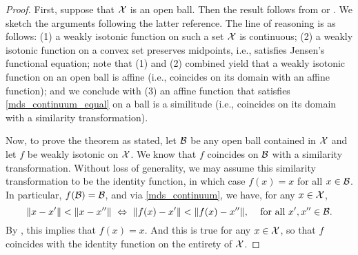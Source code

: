 \documentclass[twoside, 11pt]{article}
\begin{document}
\begin{proof}
First, suppose that $\mathcal{X}$ is an open ball. Then the result follows from \cite[Prop~7]{klein} or \cite[Th~1]{arias2017some}.
We sketch the arguments following the latter reference. The line of reasoning is as follows: (1) a weakly isotonic function on such a set $\mathcal{X}$ is continuous; (2) a weakly isotonic function on a convex set preserves midpoints, i.e., satisfies Jensen's functional equation; 
note that (1) and (2) combined yield that a weakly isotonic function on an open ball is affine (i.e., coincides on its domain with an affine function); and we conclude with (3) an affine function that satisfies \eqref{mds_continuum_equal} on a ball is a similitude (i.e., coincides on its domain with a similarity transformation). 

Now, to prove the theorem as stated, let $\mathcal{B}$ be any open ball contained in $\mathcal{X}$ and let $f$ be weakly isotonic on $\mathcal{X}$.
We know that $f$ coincides on $\mathcal{B}$ with a similarity transformation. Without loss of generality, we may assume this similarity transformation to be the identity function, in which case $f(x) = x$ for all $x \in \mathcal{B}$. 
In particular, $f(\mathcal{B}) = \mathcal{B}$, and via \eqref{mds_continuum}, we have, for any $x \in \mathcal{X}$,
\begin{equation}
\text{$\|x-x'\| < \|x-x''\| \ \Leftrightarrow \  \|f(x)-x'\| < \|f(x)-x''\|$, \quad for all $x', x'' \in \mathcal{B}$.}
\end{equation}
By , this implies that $f(x) = x$. And this is true for any $x \in \mathcal{X}$, so that $f$ coincides with the identity function on the entirety of $\mathcal{X}$.
\end{proof}
%
\end{document}
